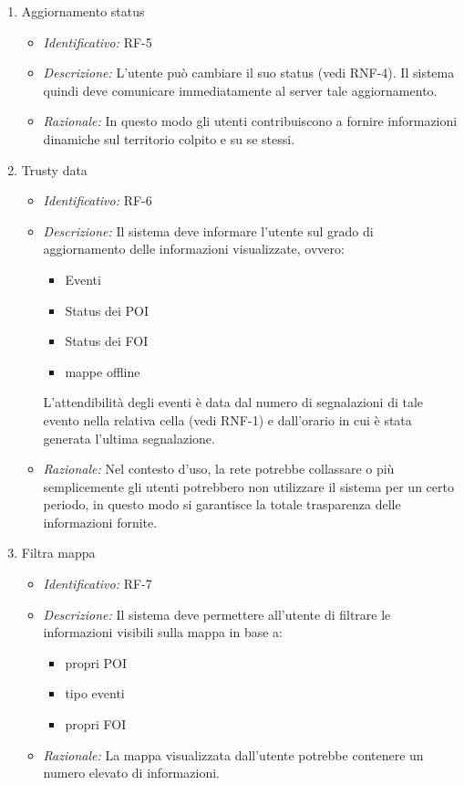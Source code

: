 \begin{enumerate}
   \item Aggiornamento status
  \begin{itemize}
  \item\textit{Identificativo:} RF-5
  \item\textit{Descrizione:} L’utente può cambiare il suo status (vedi RNF-4). Il sistema quindi deve comunicare immediatamente al server tale aggiornamento.
  \item\textit{Razionale:} In questo modo gli utenti contribuiscono a fornire informazioni dinamiche sul territorio colpito e su se stessi.
  \end{itemize}
  
  \item Trusty data
  \begin{itemize}
  \item\textit{Identificativo:} RF-6
  \item\textit{Descrizione:} Il sistema deve informare l’utente sul grado di aggiornamento delle informazioni visualizzate, ovvero:
    \begin{itemize}
    \item Eventi
    \item Status dei POI
    \item Status dei FOI
    \item mappe offline
    \end{itemize}
   L’attendibilità degli eventi è data dal numero di segnalazioni di tale evento nella relativa cella (vedi RNF-1) e dall’orario in cui è stata generata l’ultima    segnalazione.
   \item\textit{ Razionale:} Nel contesto d’uso, la rete potrebbe collassare o più semplicemente gli utenti potrebbero non utilizzare il sistema per un certo periodo, in questo modo si garantisce la totale trasparenza delle informazioni fornite.
  \end{itemize}
  
  \item Filtra mappa
  \begin{itemize}
  \item\textit{Identificativo:} RF-7
  \item\textit{Descrizione:} Il sistema deve permettere all’utente di filtrare le informazioni visibili sulla mappa in base a:
    \begin{itemize}
    \item propri POI
    \item tipo eventi
    \item propri FOI
    \end{itemize}
   \item\textit{Razionale:} La mappa visualizzata dall’utente potrebbe contenere un numero elevato di informazioni.
  \end{itemize}
  

\end{enumerate}
